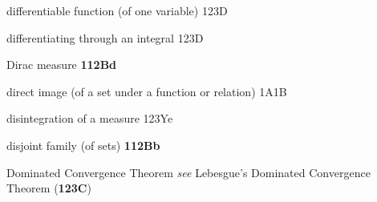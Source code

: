 

differentiable function (of one variable) 123D



differentiating through an integral 123D













Dirac measure {\bf 112Bd}

direct image (of a set under a function or relation) 1A1B


























disintegration of a measure 123Ye


disjoint family (of sets) {\bf 112Bb}







































Dominated Convergence Theorem {\it see} Lebesgue's Dominated Convergence
Theorem ({\bf 123C})




